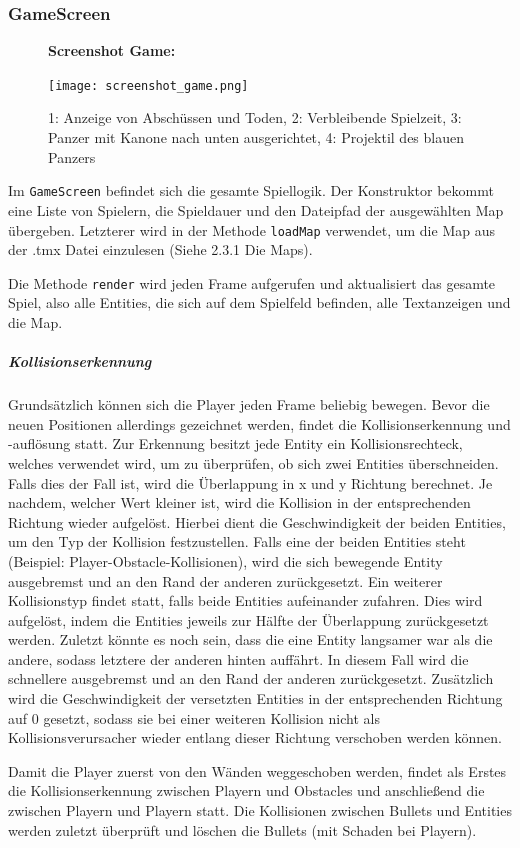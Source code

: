 \documentclass[10pt]{report}
\def\code#1{\texttt{#1}}
\begin{document}
\subsubsection{GameScreen}
\begin{figure}[H]
  \textbf{Screenshot Game:}\par\medskip
  \centering
\texttt{[image: screenshot\_game.png]}    \caption{1: Anzeige von Abschüssen und Toden, 2: Verbleibende Spielzeit, 3: Panzer mit Kanone nach unten ausgerichtet, 4: Projektil des blauen Panzers}
\end{figure}
Im \code{GameScreen} befindet sich die gesamte Spiellogik. Der Konstruktor bekommt eine Liste von Spielern, die Spieldauer und den Dateipfad der ausgewählten Map übergeben.
Letzterer wird in der Methode \code{loadMap} verwendet, um die Map aus der .tmx Datei einzulesen (Siehe 2.3.1 Die Maps).

Die Methode \code{render} wird jeden Frame aufgerufen und aktualisiert das gesamte Spiel, also alle Entities, die sich auf dem Spielfeld befinden, alle Textanzeigen und die Map.
\subparagraph{Kollisionserkennung} Grundsätzlich können sich die Player jeden Frame beliebig bewegen. Bevor die neuen Positionen allerdings gezeichnet werden, findet die Kollisionserkennung und -auflösung statt. Zur Erkennung besitzt jede Entity ein Kollisionsrechteck, welches verwendet wird, um zu überprüfen, ob sich zwei Entities überschneiden. Falls dies der Fall ist, wird die Überlappung in x und y Richtung berechnet. Je nachdem, welcher Wert kleiner ist, wird die Kollision in der entsprechenden Richtung wieder aufgelöst.
Hierbei dient die Geschwindigkeit der beiden Entities, um den Typ der Kollision festzustellen. Falls eine der beiden Entities steht (Beispiel: Player-Obstacle-Kollisionen), wird die sich bewegende Entity ausgebremst und an den Rand der anderen zurückgesetzt. Ein weiterer Kollisionstyp findet statt, falls beide Entities aufeinander zufahren. Dies wird aufgelöst, indem die Entities jeweils zur Hälfte der Überlappung zurückgesetzt werden. Zuletzt könnte es noch sein, dass die eine Entity langsamer war als die andere, sodass letztere der anderen hinten auffährt. In diesem Fall wird die schnellere ausgebremst und an den Rand der anderen zurückgesetzt.
Zusätzlich wird die Geschwindigkeit der versetzten Entities in der entsprechenden Richtung auf 0 gesetzt, sodass sie bei einer weiteren Kollision nicht als Kollisionsverursacher wieder entlang dieser Richtung verschoben werden können.

Damit die Player zuerst von den Wänden weggeschoben werden, findet als Erstes die Kollisionserkennung zwischen Playern und Obstacles und anschließend die zwischen Playern und Playern statt. Die Kollisionen zwischen Bullets und Entities werden zuletzt überprüft und löschen die Bullets (mit Schaden bei Playern).
\newpage
\end{document}

